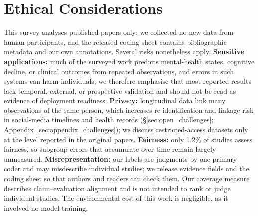 \documentclass[11pt]{article}
\newif\ifLoMEDBibStyleSet
\let\LoMEDOriginalBibStyle
\renewcommand{}[1]{\ifLoMEDBibStyleSet\else\global\LoMEDBibStyleSettrue\LoMEDOriginalBibStyle{#1}\fi}
\theoremstyle{plain}
\theoremstyle{definition}
\theoremstyle{remark}
\begin{document}
\section{Ethical Considerations}
\label{sec:ethics}
This survey analyses published papers only; we collected no new data from human participants, and the released coding sheet contains bibliographic metadata and our own annotations. Several risks nonetheless apply. \textbf{Sensitive applications:} much of the surveyed work predicts mental-health states, cognitive decline, or clinical outcomes from repeated observations, and errors in such systems can harm individuals; we therefore emphasise that most reported results lack temporal, external, or prospective validation and should not be read as evidence of deployment readiness. \textbf{Privacy:} longitudinal data link many observations of the same person, which increases re-identification and linkage risk in social-media timelines and health records (\S\ref{sec:open_challenges}; Appendix~\ref{sec:appendix_challenges}); we discuss restricted-access datasets only at the level reported in the original papers. \textbf{Fairness:} only 1.2\% of studies assess fairness, so subgroup errors that accumulate over time remain largely unmeasured. \textbf{Misrepresentation:} our labels are judgments by one primary coder and may misdescribe individual studies; we release evidence fields and the coding sheet so that authors and readers can check them. Our coverage measure describes claim--evaluation alignment and is not intended to rank or judge individual studies. The environmental cost of this work is negligible, as it involved no model training.


\appendix
\clearpage
\end{document}

